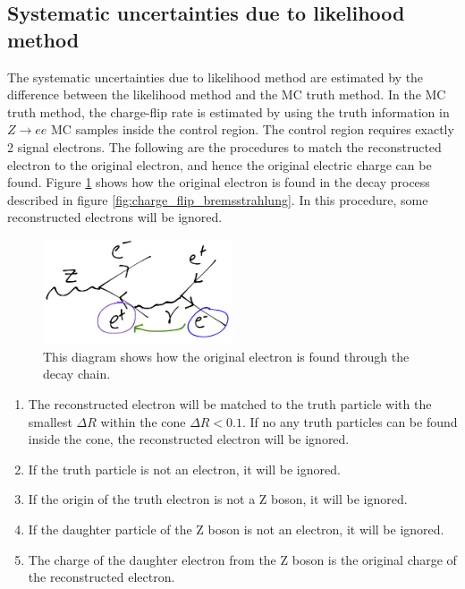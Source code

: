 \subsection{Systematic uncertainties due to likelihood method}
\label{sec:sys_likelihood}
The systematic uncertainties due to likelihood method are estimated by the difference between the likelihood method and the MC truth method.
In the MC truth method, the charge-flip rate is estimated by using the truth information in $Z \rightarrow ee$ MC samples inside the control region.
The control region requires exactly 2 signal electrons.
The following are the procedures to match the reconstructed electron to the original electron, and hence the original electric charge can be found.
Figure \ref{fig:charge_flip_MC_match} shows how the original electron is found in the decay process described in figure \ref{fig:charge_flip_bremsstrahlung}. In this procedure, some reconstructed electrons will be ignored.
\begin{figure}
\centering
\includegraphics[width=0.5\textwidth]{data/photo/charge_flip/MC-truth.png}
\caption{This diagram shows how the original electron is found through the decay chain.}
\label{fig:charge_flip_MC_match}
\end{figure}
\begin{enumerate}
\item The reconstructed electron will be matched to the truth particle with the smallest $\Delta R$ within the cone $\Delta R < 0.1$. If no any truth particles can be found inside the cone, the reconstructed electron will be ignored.
\item If the truth particle is not an electron, it will be ignored.
\item If the origin of the truth electron is not a Z boson, it will be ignored.
\item If the daughter particle of the Z boson is not an electron, it will be ignored.
\item The charge of the daughter electron from the Z boson is the original charge of the reconstructed electron.
\end{enumerate}

